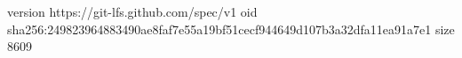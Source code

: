 version https://git-lfs.github.com/spec/v1
oid sha256:249823964883490ae8faf7e55a19bf51cecf944649d107b3a32dfa11ea91a7e1
size 8609
